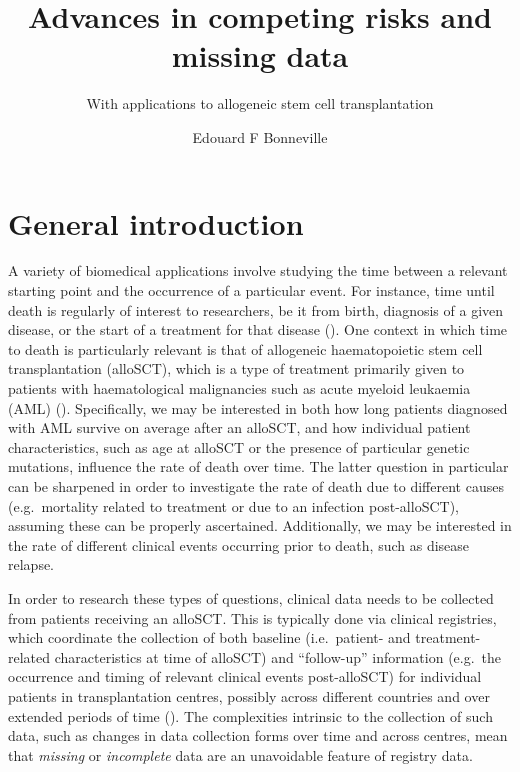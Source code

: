 \documentclass[
  letterpaper,
  DIV=11,
  numbers=noendperiod]{scrreprt}
\title{Advances in competing risks and missing data}
\subtitle{With applications to allogeneic stem cell transplantation}
\author{Edouard F Bonneville}
\date{}
\renewcommand*\contentsname{Table of contents}
\newcommand\contentsname{Table of contents}
\begin{document}
\maketitle

\renewcommand*\contentsname{Table of contents}
{
\hypersetup{linkcolor=}
\setcounter{tocdepth}{1}
\tableofcontents
}
\listoffigures
\listoftables


\chapter{General introduction}\label{general-introduction}

A variety of biomedical applications involve studying the time between a
relevant starting point and the occurrence of a particular event. For
instance, time until death is regularly of interest to researchers, be
it from birth, diagnosis of a given disease, or the start of a treatment
for that disease
(). One context in which time to death is
particularly relevant is that of allogeneic haematopoietic stem cell
transplantation (alloSCT), which is a type of treatment primarily given
to patients with haematological malignancies such as acute myeloid
leukaemia (AML)
(). Specifically, we may be interested in both how
long patients diagnosed with AML survive on average after an alloSCT,
and how individual patient characteristics, such as age at alloSCT or
the presence of particular genetic mutations, influence the rate of
death over time. The latter question in particular can be sharpened in
order to investigate the rate of death due to different causes
(e.g.~mortality related to treatment or due to an infection
post-alloSCT), assuming these can be properly ascertained. Additionally,
we may be interested in the rate of different clinical events occurring
prior to death, such as disease relapse.

In order to research these types of questions, clinical data needs to be
collected from patients receiving an alloSCT. This is typically done via
clinical registries, which coordinate the collection of both baseline
(i.e.~patient- and treatment-related characteristics at time of alloSCT)
and ``follow-up'' information (e.g.~the occurrence and timing of
relevant clinical events post-alloSCT) for individual patients in
transplantation centres, possibly across different countries and over
extended periods of time
().
The complexities intrinsic to the collection of such data, such as
changes in data collection forms over time and across centres, mean that
\emph{missing} or \emph{incomplete} data are an unavoidable feature of
registry data.
\end{document}
